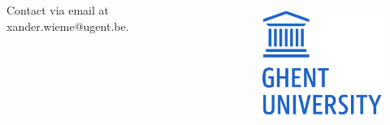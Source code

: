 \documentclass[12pt, a2paper, portrait]{tikzposter}
\begin{document}
\begin{columns}
	 {
		\vspace{-1cm}
		
	}






	 {
		Contact via email at xander.wieme@ugent.be. \\
		\begin{figure}
			\vspace{-4cm}
			\begin{tikzfigure}[]
				\includegraphics[height=4cm]{figures/ugent_logo}
			\end{tikzfigure}
		\end{figure}
	}


\end{columns}
\end{document}
